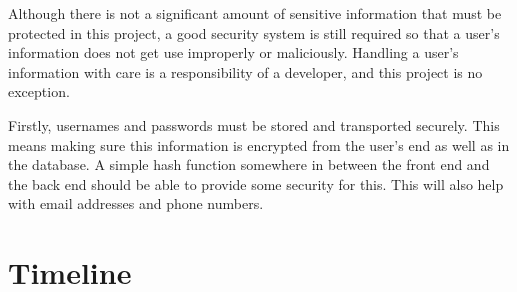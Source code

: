 \documentclass[10pt,twocolumn]{article}
\begin{document}
Although there is not a significant amount of sensitive information that must be protected in this project, a good security system is still required so that a user's information does not get use improperly or maliciously.
Handling a user's information with care is a responsibility of a developer, and this project is no exception.

Firstly, usernames and passwords must be stored and transported securely.
This means making sure this information is encrypted from the user's end as well as in the database.
A simple hash function somewhere in between the front end and the back end should be able to provide some security for this.
This will also help with email addresses and phone numbers.

\section{Timeline}

\printbibliography
\end{document}
